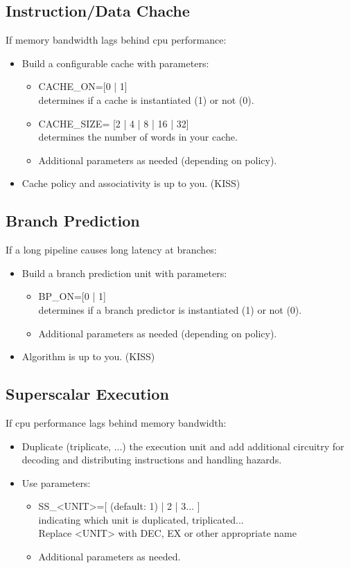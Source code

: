 \subsection{Instruction/Data Chache}
If memory bandwidth lags behind cpu performance:
\begin{itemize}
\item Build a configurable cache with parameters:
\begin{itemize}
\item	CACHE\_ON=[0 | 1]\\
		determines if a cache is instantiated (1) or not (0).
\item	CACHE\_SIZE= [2 | 4 | 8 | 16 | 32]\\
		determines the number of words in your cache.
\item	Additional parameters as needed (depending on policy).
\end{itemize} 
\item Cache policy and associativity is up to you. (KISS)
\end{itemize}

\subsection{Branch Prediction}		 
If a long pipeline causes long latency at branches:
\begin{itemize}
\item Build a branch prediction unit with parameters:
\begin{itemize}
\item	BP\_ON=[0 | 1]\\
		determines if a branch predictor is instantiated (1) or not (0).
\item	Additional parameters as needed (depending on policy).
\end{itemize} 
\item Algorithm is up to you. (KISS)
\end{itemize}

\subsection{Superscalar Execution}
If cpu performance lags behind memory bandwidth:
\begin{itemize}
\item Duplicate (triplicate, ...) the execution unit and add additional circuitry for decoding and distributing instructions and handling hazards.
\item Use parameters:
\begin{itemize}
\item	SS\_<UNIT>=[ (default: 1) | 2 | 3... ]\\
		indicating which unit is duplicated, triplicated...\\
		Replace <UNIT> with DEC, EX or other appropriate name
\item	Additional parameters as needed.
\end{itemize} 
\end{itemize}

